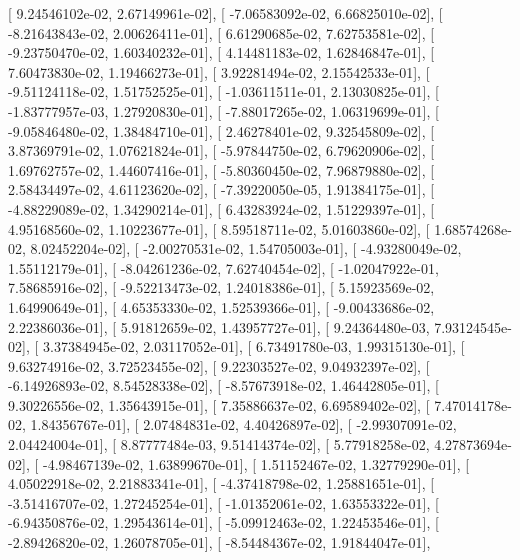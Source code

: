 \documentclass{article}
\begin{document}
       [  9.24546102e-02,   2.67149961e-02],
       [ -7.06583092e-02,   6.66825010e-02],
       [ -8.21643843e-02,   2.00626411e-01],
       [  6.61290685e-02,   7.62753581e-02],
       [ -9.23750470e-02,   1.60340232e-01],
       [  4.14481183e-02,   1.62846847e-01],
       [  7.60473830e-02,   1.19466273e-01],
       [  3.92281494e-02,   2.15542533e-01],
       [ -9.51124118e-02,   1.51752525e-01],
       [ -1.03611511e-01,   2.13030825e-01],
       [ -1.83777957e-03,   1.27920830e-01],
       [ -7.88017265e-02,   1.06319699e-01],
       [ -9.05846480e-02,   1.38484710e-01],
       [  2.46278401e-02,   9.32545809e-02],
       [  3.87369791e-02,   1.07621824e-01],
       [ -5.97844750e-02,   6.79620906e-02],
       [  1.69762757e-02,   1.44607416e-01],
       [ -5.80360450e-02,   7.96879880e-02],
       [  2.58434497e-02,   4.61123620e-02],
       [ -7.39220050e-05,   1.91384175e-01],
       [ -4.88229089e-02,   1.34290214e-01],
       [  6.43283924e-02,   1.51229397e-01],
       [  4.95168560e-02,   1.10223677e-01],
       [  8.59518711e-02,   5.01603860e-02],
       [  1.68574268e-02,   8.02452204e-02],
       [ -2.00270531e-02,   1.54705003e-01],
       [ -4.93280049e-02,   1.55112179e-01],
       [ -8.04261236e-02,   7.62740454e-02],
       [ -1.02047922e-01,   7.58685916e-02],
       [ -9.52213473e-02,   1.24018386e-01],
       [  5.15923569e-02,   1.64990649e-01],
       [  4.65353330e-02,   1.52539366e-01],
       [ -9.00433686e-02,   2.22386036e-01],
       [  5.91812659e-02,   1.43957727e-01],
       [  9.24364480e-03,   7.93124545e-02],
       [  3.37384945e-02,   2.03117052e-01],
       [  6.73491780e-03,   1.99315130e-01],
       [  9.63274916e-02,   3.72523455e-02],
       [  9.22303527e-02,   9.04932397e-02],
       [ -6.14926893e-02,   8.54528338e-02],
       [ -8.57673918e-02,   1.46442805e-01],
       [  9.30226556e-02,   1.35643915e-01],
       [  7.35886637e-02,   6.69589402e-02],
       [  7.47014178e-02,   1.84356767e-01],
       [  2.07484831e-02,   4.40426897e-02],
       [ -2.99307091e-02,   2.04424004e-01],
       [  8.87777484e-03,   9.51414374e-02],
       [  5.77918258e-02,   4.27873694e-02],
       [ -4.98467139e-02,   1.63899670e-01],
       [  1.51152467e-02,   1.32779290e-01],
       [  4.05022918e-02,   2.21883341e-01],
       [ -4.37418798e-02,   1.25881651e-01],
       [ -3.51416707e-02,   1.27245254e-01],
       [ -1.01352061e-02,   1.63553322e-01],
       [ -6.94350876e-02,   1.29543614e-01],
       [ -5.09912463e-02,   1.22453546e-01],
       [ -2.89426820e-02,   1.26078705e-01],
       [ -8.54484367e-02,   1.91844047e-01],
\end{document}
